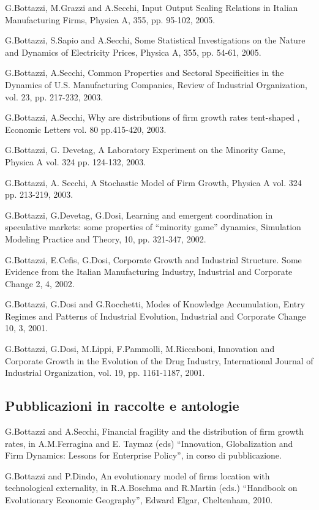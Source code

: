 \documentclass[a4paper]{article}
\begin{document}
G.Bottazzi, M.Grazzi and A.Secchi, Input Output Scaling Relations in
Italian Manufacturing Firms, Physica A, 355, pp.  95-102, 2005.

G.Bottazzi, S.Sapio and A.Secchi, Some Statistical Investigations on
the Nature and Dynamics of Electricity Prices, Physica A, 355, pp.
54-61, 2005.

G.Bottazzi, A.Secchi, Common Properties and Sectoral Specificities in
the Dynamics of U.S. Manufacturing Companies, Review of Industrial
Organization, vol. 23, pp. 217-232, 2003.

G.Bottazzi, A.Secchi, Why are distributions of firm growth rates
tent-shaped , Economic Letters vol. 80 pp.415-420, 2003.

G.Bottazzi, G. Devetag, A Laboratory Experiment on the Minority Game,
Physica A vol. 324 pp. 124-132, 2003.

G.Bottazzi, A. Secchi, A Stochastic Model of Firm Growth, Physica A
vol. 324 pp. 213-219, 2003.

G.Bottazzi, G.Devetag, G.Dosi, Learning and emergent coordination in
speculative markets: some properties of ``minority game'' dynamics,
Simulation Modeling Practice and Theory, 10, pp. 321-347, 2002.

G.Bottazzi, E.Cefis, G.Dosi, Corporate Growth and Industrial
Structure. Some Evidence from the Italian Manufacturing Industry,
Industrial and Corporate Change 2, 4, 2002.

G.Bottazzi, G.Dosi and G.Rocchetti, Modes of Knowledge Accumulation,
Entry Regimes and Patterns of Industrial Evolution, Industrial and
Corporate Change 10, 3, 2001.

G.Bottazzi, G.Dosi, M.Lippi, F.Pammolli, M.Riccaboni, Innovation and
Corporate Growth in the Evolution of the Drug Industry, International
Journal of Industrial Organization, vol. 19, pp. 1161-1187, 2001.


\subsection{Pubblicazioni in raccolte e antologie%
  \label{pubblicazioni-in-raccolte-e-antologie}%
}

G.Bottazzi and A.Secchi, Financial fragility and the distribution of
firm growth rates, in A.M.Ferragina and E. Taymaz (eds) ``Innovation,
Globalization and Firm Dynamics: Lessons for Enterprise Policy'', in
corso di pubblicazione.

G.Bottazzi and P.Dindo, An evolutionary model of firms location with
technological externality, in R.A.Boschma and R.Martin (eds.)
``Handbook on Evolutionary Economic Geography'', Edward Elgar,
Cheltenham, 2010.
\end{document}
